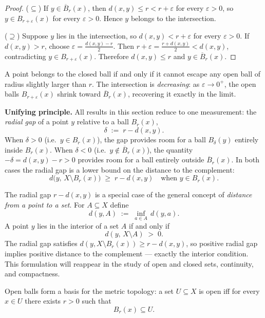 \begin{proof}
($\subseteq$)\;
If $y\in\overline{B}_r(x)$, then $d(x,y)\le r < r+\varepsilon$ for every
$\varepsilon>0$, so $y\in B_{r+\varepsilon}(x)$ for every $\varepsilon>0$.
Hence $y$ belongs to the intersection.

($\supseteq$)\;
Suppose $y$ lies in the intersection, so $d(x,y)<r+\varepsilon$ for every
$\varepsilon>0$.
If $d(x,y)>r$, choose $\varepsilon = \tfrac{d(x,y)-r}{2}$.
Then $r+\varepsilon = \tfrac{r+d(x,y)}{2} < d(x,y)$, contradicting
$y\in B_{r+\varepsilon}(x)$.
Therefore $d(x,y)\le r$ and $y\in\overline{B}_r(x)$.
\end{proof}

\begin{remark*}
A point belongs to the closed ball if and only if it cannot escape any
open ball of radius slightly larger than $r$.
The intersection is \emph{decreasing}: as $\varepsilon\to 0^+$, the
open balls $B_{r+\varepsilon}(x)$ shrink toward $\overline{B}_r(x)$,
recovering it exactly in the limit.
\end{remark*}


\bigskip

\bigskip

\begin{tcolorbox}[colback=propbox, colframe=propborder, arc=2pt,
  left=8pt, right=8pt, top=6pt, bottom=6pt]
\noindent\textbf{Unifying principle.}\quad
All results in this section reduce to one measurement: the
\emph{radial gap} of a point $y$ relative to a ball $B_r(x)$,
\[
\delta \;:=\; r - d(x,y).
\]
When $\delta > 0$ (i.e.\ $y\in B_r(x)$), the gap provides room for a
ball $B_\delta(y)$ entirely inside $B_r(x)$.
When $\delta < 0$ (i.e.\ $y\notin\overline{B}_r(x)$), the quantity
$-\delta = d(x,y)-r > 0$ provides room for a ball entirely outside
$\overline{B}_r(x)$.
In both cases the radial gap is a lower bound on the distance to the
complement:
\[
d\bigl(y,\,X\setminus B_r(x)\bigr) \;\ge\; r - d(x,y)
\quad\text{when } y\in B_r(x).
\]
\end{tcolorbox}

\begin{remark*}
The radial gap $r - d(x,y)$ is a special case of the general concept
of \emph{distance from a point to a set}.
For $A\subseteq X$ define
\[
d(y,A) \;:=\; \inf_{a\in A}\, d(y,a).
\]
A point $y$ lies in the interior of a set $A$ if and only if
\[
d(y,\, X\setminus A) \;>\; 0.
\]
The radial gap satisfies $d(y, X\setminus B_r(x)) \ge r - d(x,y)$, so
positive radial gap implies positive distance to the complement ---
exactly the interior condition.
This formulation will reappear in the study of open and closed sets,
continuity, and compactness.
\end{remark*}

\begin{remark*}
Open balls form a basis for the metric topology: a set $U\subseteq X$ is open
iff for every $x\in U$ there exists $r>0$ such that
\[
B_r(x)\subseteq U.
\]
\end{remark*}